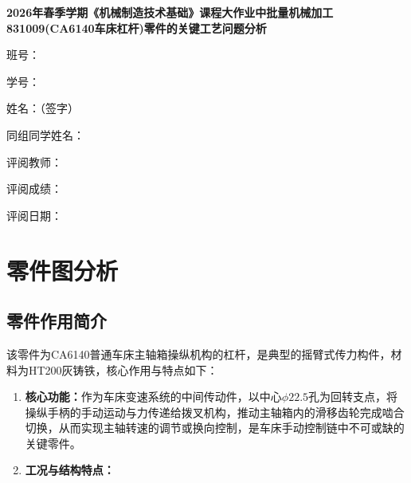 \documentclass[12pt,a4paper,fontset=none]{ctexart}
\begin{document}
    \begin{titlepage}
        \centering
        \vspace*{2.5cm}
        {\bfseries 2026年春季学期《机械制造技术基础》课程大作业中批量机械加工831009(CA6140车床杠杆)零件的关键工艺问题分析\par}
        \vspace{1.2cm}

        班号：\underline{\hspace{6cm}}\par
        \vspace{0.3cm}
        学号：\underline{\hspace{6cm}}\par
        \vspace{0.3cm}
        姓名：（签字）\underline{\hspace{6cm}}\par
        \vspace{0.3cm}
        同组同学姓名：\underline{\hspace{6cm}}\par
        \vspace{0.3cm}
        评阅教师：\underline{\hspace{6cm}}\par
        \vspace{0.3cm}
        评阅成绩：\underline{\hspace{6cm}}\par
        \vspace{0.3cm}
        评阅日期：\underline{\hspace{6cm}}\par

        \vfill
    \end{titlepage}

    \tableofcontents
    \newpage


    \section{零件图分析}

    \subsection{零件作用简介}

    该零件为CA6140普通车床主轴箱操纵机构的杠杆，是典型的摇臂式传力构件，材料为HT200灰铸铁，核心作用与特点如下：

    \begin{enumerate}
        \item \textbf{核心功能：}作为车床变速系统的中间传动件，以中心$\phi22.5$孔为回转支点，将操纵手柄的手动运动与力传递给拨叉机构，推动主轴箱内的滑移齿轮完成啮合切换，从而实现主轴转速的调节或换向控制，是车床手动控制链中不可或缺的关键零件。
        \item \textbf{工况与结构特点：}
    \end{enumerate}
\end{document}
